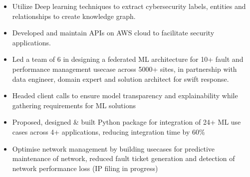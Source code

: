 \documentclass[10pt,a4paper,ragged2e,withhyper]{altacv}
\author{Madhusudan Kumar}
\date{\today}
\title{}
\begin{document}

\makecvheader

\begin{paracol}{2}
\label{sec:org6ed8d3e}

\begin{itemize}
\item Utilize Deep learning techniques to extract cybersecurity labels, entities and relationships to create knowledge graph.

\item Developed and maintain APIs on AWS cloud to facilitate security applications.

\end{itemize}
\par\divider
{}
\begin{itemize}
\item Led a team of 6 in designing a federated ML architecture for 10+ fault and performance management usecase across 5000+ sites, in partnership with data engineer, domain expert and solution architect for swift response.
\end{itemize}

\begin{itemize}
\item Headed client calls to ensure model transparency and explainability while gathering requirements for ML solutions
\end{itemize}


\par\divider
{}
\begin{itemize}
\item Proposed, designed \& built Python package for integration of 24+ ML use cases across 4+ applications, reducing integration time by 60\%
\item Optimise network management by building usecases for predictive maintenance of network, reduced fault ticket generation and detection of network performance loss (IP filing in progress)
\end{itemize}


\end{paracol}
\end{document}
